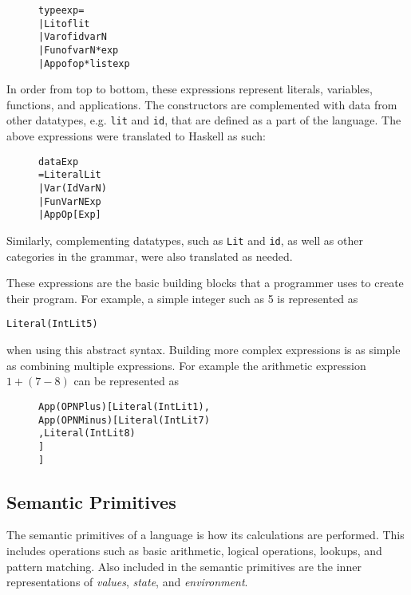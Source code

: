 \begin{figure}[H]
\begin{alltt}
  type exp =
    | Lit of lit
    | Var of id varN
    | Fun of varN * exp
    | App of op * list exp
\end{alltt}
\end{figure}

\noindent In order from top to bottom, these expressions represent literals,
variables, functions, and applications. The constructors are complemented with
data from other datatypes, e.g. \texttt{lit} and \texttt{id}, that are defined
as a part of the language.
The above expressions were translated to Haskell as such:

\begin{figure}[H]
\begin{alltt}
  data Exp
    = Literal Lit
    | Var (Id VarN)
    | Fun VarN Exp
    | App Op [Exp]
\end{alltt}
\end{figure}

\noindent Similarly, complementing datatypes, such as \texttt{Lit} and
\texttt{id}, as well as other categories in the grammar, were also translated
as needed.

These expressions are the basic building blocks that a programmer uses to create
their program. For example, a simple integer such as 5 is represented as
\begin{alltt}
  Literal (IntLit 5)
\end{alltt}
when using this abstract syntax. Building more
complex expressions is as simple as combining multiple expressions. For example
the arithmetic expression $1 + (7 - 8)$ can be represented as

\begin{figure}[H]
\begin{alltt}
  App (OPN Plus) [Literal (IntLit 1),
                  App (OPN Minus) [Literal (IntLit 7)
                                  ,Literal (IntLit 8)
                                  ]
                 ]
\end{alltt}
\end{figure}

\subsection{Semantic Primitives}
The semantic primitives of a language is how its calculations are performed.
This includes operations such as basic arithmetic, logical operations,
lookups, and pattern matching. Also included in the semantic primitives are
the inner representations of \textit{values}, \textit{state}, and
\textit{environment}.

